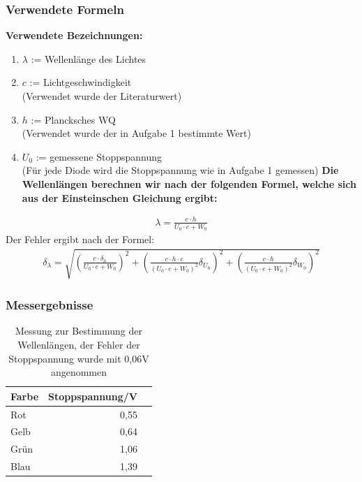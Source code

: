 \documentclass[12px]{scrartcl}
\begin{document}
\subsubsection{Verwendete Formeln}
\textbf{Verwendete Bezeichnungen:}
\begin{enumerate}
\item $\lambda$ := Wellenlänge des Lichtes
\item $c$ := Lichtgeschwindigkeit\\
(Verwendet wurde der Literaturwert)
\item $h$ := Plancksches WQ\\
(Verwendet wurde der in Aufgabe 1 bestimmte Wert)
\item $U_0$ := gemessene Stoppspannung\\
(Für jede Diode wird die Stoppspannung wie in Aufgabe 1 gemessen)
\textbf{Die Wellenlängen berechnen wir nach der folgenden Formel, welche sich aus der Einsteinschen Gleichung ergibt:}
\end{enumerate}
\begin{align}
\lambda = \frac{c \cdot h}{U_0\cdot e + W_0}
\label{eqn:lambda}
\end{align}
Der Fehler ergibt nach der Formel:
\begin{align}
\delta_{\lambda} = \sqrt{
\left(\frac{c \cdot\delta_h}{U_0\cdot e + W_0}\right)^2+
\left(\frac{c \cdot h \cdot e}{(U_0\cdot e + W_0)^2}\delta_{U_0}\right)^2+
\left(\frac{c \cdot h}{(U_0\cdot e + W_0)^2}\delta_{W_0}\right)^2}
\label{eqn:lambda_delta}
\end{align}


\subsubsection{Messergebnisse}
\begin{table}[H]
\caption{Messung zur Bestimmung der Wellenlängen, der Fehler der Stoppspannung wurde mit 0,06V angenommen}
\begin{center}
\begin{tabular}{|l|r|r|}
\hline
Farbe & \multicolumn{1}{l|}{Stoppspannung/V} \\ \hline
Rot & 0,55 \\ \hline
Gelb & 0,64 \\ \hline
Grün & 1,06 \\ \hline
Blau & 1,39 \\ \hline
\end{tabular}
\end{center}
\label{tab:a_2.2}
\end{table}
\end{document}
